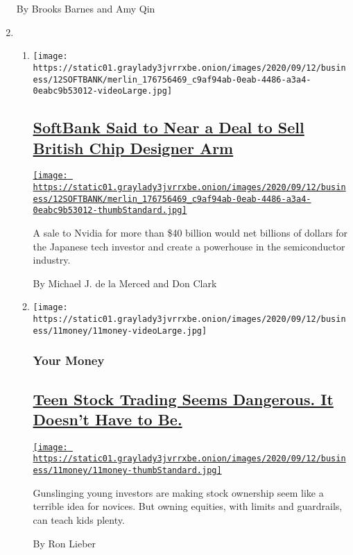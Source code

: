 \begin{enumerate}
  By Brooks Barnes and Amy Qin
\item
  \begin{enumerate}
  \def\labelenumii{\arabic{enumii}.}
  \item
    \texttt{[image: https://static01.graylady3jvrrxbe.onion/images/2020/09/12/business/12SOFTBANK/merlin\_176756469\_c9af94ab-0eab-4486-a3a4-0eabc9b53012-videoLarge.jpg]}

    \hypertarget{softbank-said-to-near-a-deal-to-sell-british-chip-designer-arm}{%
    \subsection{\texorpdfstring{\href{/2020/09/12/business/dealbook/softbank-arm-nvidia-computer-chips-sale.html}{SoftBank
    Said to Near a Deal to Sell British Chip Designer
    Arm}}{SoftBank Said to Near a Deal to Sell British Chip Designer Arm}}\label{softbank-said-to-near-a-deal-to-sell-british-chip-designer-arm}}

    \href{/2020/09/12/business/dealbook/softbank-arm-nvidia-computer-chips-sale.html}{\texttt{[image: https://static01.graylady3jvrrxbe.onion/images/2020/09/12/business/12SOFTBANK/merlin\_176756469\_c9af94ab-0eab-4486-a3a4-0eabc9b53012-thumbStandard.jpg]}}

    A sale to Nvidia for more than \$40 billion would net billions of
    dollars for the Japanese tech investor and create a powerhouse in
    the semiconductor industry.

    By Michael J. de la Merced and Don Clark
  \item
    \texttt{[image: https://static01.graylady3jvrrxbe.onion/images/2020/09/12/business/11money/11money-videoLarge.jpg]}

    \hypertarget{your-money}{%
    \subsubsection{Your Money}\label{your-money}}

    \hypertarget{teen-stock-trading-seems-dangerous-it-doesnt-have-to-be}{%
    \subsection{\texorpdfstring{\href{/2020/09/12/your-money/stock-trading-robinhood-teens.html}{Teen
    Stock Trading Seems Dangerous. It Doesn't Have to
    Be.}}{Teen Stock Trading Seems Dangerous. It Doesn't Have to Be.}}\label{teen-stock-trading-seems-dangerous-it-doesnt-have-to-be}}

    \href{/2020/09/12/your-money/stock-trading-robinhood-teens.html}{\texttt{[image: https://static01.graylady3jvrrxbe.onion/images/2020/09/12/business/11money/11money-thumbStandard.jpg]}}

    Gunslinging young investors are making stock ownership seem like a
    terrible idea for novices. But owning equities, with limits and
    guardrails, can teach kids plenty.

    By Ron Lieber
  \end{enumerate}
\end{enumerate}

